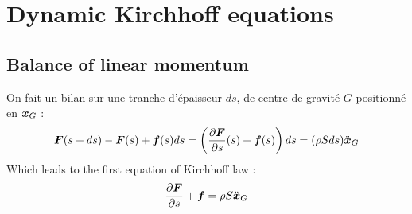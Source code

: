 \section{Dynamic Kirchhoff equations}

\subsection{Balance of linear momentum}
On fait un bilan sur une tranche d'épaisseur $ds$, de centre de gravité $G$ positionné en $\boldsymbol{x}_G$ :
\begin{equation}
	\boldsymbol{F}(s+ds)-\boldsymbol{F}(s) + \boldsymbol{f}(s)ds = \left(\frac{\partial \boldsymbol{F}}{\partial s}(s)+\boldsymbol{f}(s)\right)ds = (\rho Sds)\ddot{\boldsymbol{x}}_G
\end{equation}
Which leads to the first equation of Kirchhoff law :
\begin{equation}
	\frac{\partial \boldsymbol{F}}{\partial s}+\boldsymbol{f} = \rho S \ddot{\boldsymbol{x}}_G
\end{equation}

